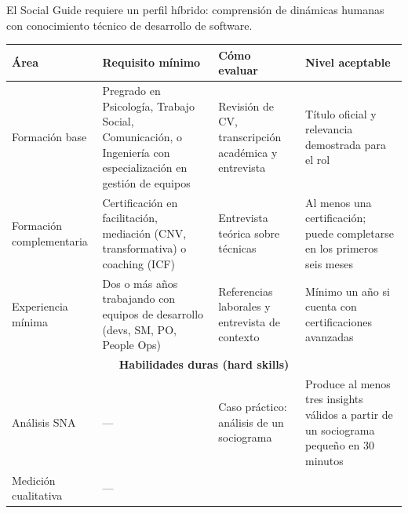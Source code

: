 El Social Guide requiere un perfil híbrido: comprensión de dinámicas humanas con conocimiento técnico de desarrollo de software.

\begin{table}[h]
    \centering
    \footnotesize
    \begin{tabularx}{\textwidth}{|p{2.6cm}|X|X|X|}
        \hline
        \textbf{Área} & \textbf{Requisito mínimo}                                                                                    & \textbf{Cómo evaluar} & \textbf{Nivel aceptable} \\
        \hline
        Formación base
                      & Pregrado en Psicología, Trabajo Social, Comunicación, o Ingeniería con especialización en gestión de equipos
                      & Revisión de CV, transcripción académica y entrevista
                      & Título oficial y relevancia demostrada para el rol                                                                                                              \\
        \hline
        Formación complementaria
                      & Certificación en facilitación, mediación (CNV, transformativa) o coaching (ICF)
                      & Entrevista teórica sobre técnicas
                      & Al menos una certificación; puede completarse en los primeros seis meses                                                                                        \\
        \hline
        Experiencia mínima
                      & Dos o más años trabajando con equipos de desarrollo (devs, SM, PO, People Ops)
                      & Referencias laborales y entrevista de contexto
                      & Mínimo un año si cuenta con certificaciones avanzadas                                                                                                           \\
        \hline
        \multicolumn{4}{|c|}{\textbf{Habilidades duras (hard skills)}}                                                                                                                  \\
        \hline
        Análisis SNA
                      & ---
                      & Caso práctico: análisis de un sociograma
                      & Produce al menos tres insights válidos a partir de un sociograma pequeño en 30 minutos                                                                          \\
        \hline
        Medición cualitativa
                      & ---

\end{tabularx}
\end{table}
